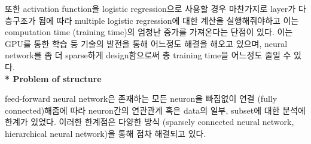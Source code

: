 \documentclass[draft=false]{oblivoir}
\begin{document}
또한 activation function을 logistic regression으로 사용할 경우 마찬가지로 layer가 다층구조가 됨에 따라 multiple logistic regression에 대한 계산을 실행해줘야하고 이는 computation time (training time)의 엄청난 증가를 가져온다는 단점이 있다. 이는 GPU를 통한 학습 등 기술의 발전을 통해 어느정도 해결을 해오고 있으며, neural network를 좀 더 sparse하게 design함으로써 총 training time을 어느정도 줄일 수 있다.\\

\textbf{* Problem of structure}

feed-forward neural network은 존재하는 모든 neuron을 빠짐없이 연결 (fully connected)해줌에 따라 neuron간의 연관관계 혹은 data의 일부, subset에 대한 분석에 한계가 있었다. 이러한 한계점은 다양한 방식 (sparsely connected neural network, hierarchical neural network)을 통해 점차 해결되고 있다. 
\end{document}
